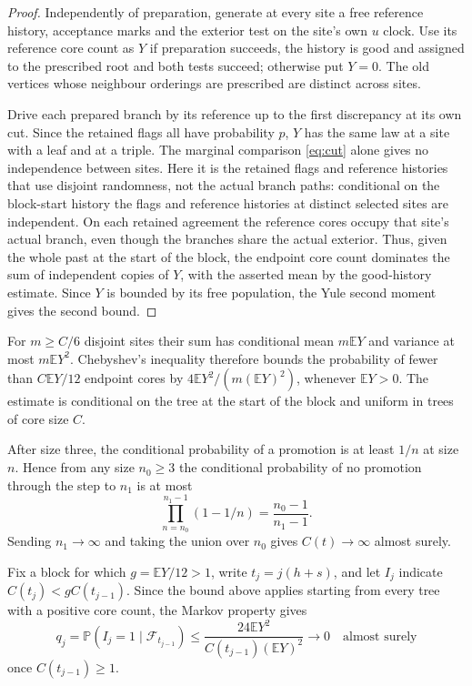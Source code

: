 \documentclass[11pt]{article}
\theoremstyle{remark}
\numberwithin{equation}{section}
\newcommand{\E}{\mathbb E}
\newcommand{\Prob}{\mathbb P}
\begin{document}
\begin{proof}
Independently of preparation, generate at every site a free reference history, acceptance marks and the exterior test on the site's own $u$ clock. Use its reference core count as $Y$ if preparation succeeds, the history is good and assigned to the prescribed root and both tests succeed; otherwise put $Y=0$. The old vertices whose neighbour orderings are prescribed are distinct across sites.

Drive each prepared branch by its reference up to the first discrepancy at its own cut. Since the retained flags all have probability $p$, $Y$ has the same law at a site with a leaf and at a triple. The marginal comparison \eqref{eq:cut} alone gives no independence between sites. Here it is the retained flags and reference histories that use disjoint randomness, not the actual branch paths: conditional on the block-start history the flags and reference histories at distinct selected sites are independent. On each retained agreement the reference cores occupy that site's actual branch, even though the branches share the actual exterior. Thus, given the whole past at the start of the block, the endpoint core count dominates the sum of independent copies of $Y$, with the asserted mean by the good-history estimate. Since $Y$ is bounded by its free population, the Yule second moment gives the second bound.
\end{proof}

For $m\ge C/6$ disjoint sites their sum has conditional mean $m\E Y$ and variance at most $m\E Y^2$. Chebyshev's inequality therefore bounds the probability of fewer than $C\E Y/12$ endpoint cores by $4\E Y^2/(m(\E Y)^2)$, whenever $\E Y>0$. The estimate is conditional on the tree at the start of the block and uniform in trees of core size $C$.

After size three, the conditional probability of a promotion is at least $1/n$ at size $n$. Hence from any size $n_0\ge3$ the conditional probability of no promotion through the step to $n_1$ is at most
\[
  \prod_{n=n_0}^{n_1-1}(1-1/n)=\frac{n_0-1}{n_1-1}.
\]
Sending $n_1\to\infty$ and taking the union over $n_0$ gives $C(t)\to\infty$ almost surely.

Fix a block for which $g=\E Y/12>1$, write $t_j=j(h+s)$, and let $I_j$ indicate $C(t_j)<g C(t_{j-1})$. Since the bound above applies starting from every tree with a positive core count, the Markov property gives
\[
 q_j=\Prob(I_j=1\mid\mathcal F_{t_{j-1}})
 \le\frac{24\E Y^2}{C(t_{j-1})(\E Y)^2}
 \longrightarrow 0\quad\text{almost surely}
\]
once $C(t_{j-1})\ge1$.
\end{document}

